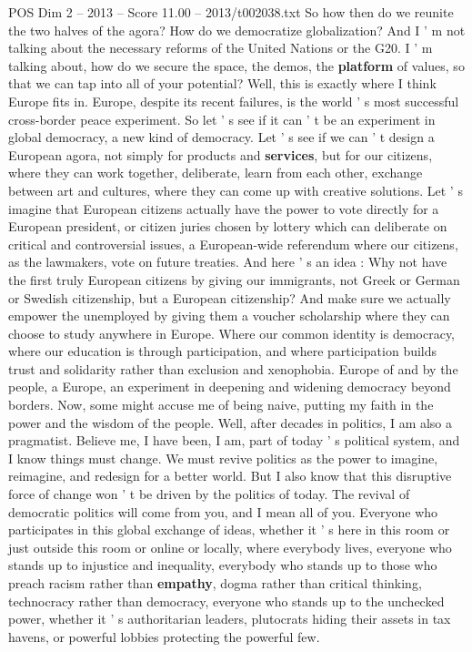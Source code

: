 \begin{textsample}{POS Dim 2 – 2013 – Score 11.00 – 2013/t002038.txt}
So how then do we reunite the two halves of the agora?
How do we democratize globalization?
And I ' m not talking about the necessary reforms of the United Nations or the G20.
I ' m talking about, how do we secure the space, the demos, the \textbf{platform} of values, so that we can tap into all of your potential?
Well, this is exactly where I think Europe fits in.
Europe, despite its recent failures, is the world ' s most successful cross-border peace experiment.
So let ' s see if it can ' t be an experiment in global democracy, a new kind of democracy.
Let ' s see if we can ' t design a European agora, not simply for products and \textbf{services}, but for our citizens, where they can work together, deliberate, learn from each other, exchange between art and cultures, where they can come up with creative solutions.
Let ' s imagine that European citizens actually have the power to vote directly for a European president, or citizen juries chosen by lottery which can deliberate on critical and controversial issues, a European-wide referendum where our citizens, as the lawmakers, vote on future treaties.
And here ' s an idea : Why not have the first truly European citizens by giving our immigrants, not Greek or German or Swedish citizenship, but a European citizenship?
And make sure we actually empower the unemployed by giving them a voucher scholarship where they can choose to study anywhere in Europe.
Where our common identity is democracy, where our education is through participation, and where participation builds trust and solidarity rather than exclusion and xenophobia.
Europe of and by the people, a Europe, an experiment in deepening and widening democracy beyond borders.
Now, some might accuse me of being naive, putting my faith in the power and the wisdom of the people.
Well, after decades in politics, I am also a pragmatist.
Believe me, I have been, I am, part of today ' s political system, and I know things must change.
We must revive politics as the power to imagine, reimagine, and redesign for a better world.
But I also know that this disruptive force of change won ' t be driven by the politics of today.
The revival of democratic politics will come from you, and I mean all of you.
Everyone who participates in this global exchange of ideas, whether it ' s here in this room or just outside this room or online or locally, where everybody lives, everyone who stands up to injustice and inequality, everybody who stands up to those who preach racism rather than \textbf{empathy}, dogma rather than critical thinking, technocracy rather than democracy, everyone who stands up to the unchecked power, whether it ' s authoritarian leaders, plutocrats hiding their assets in tax havens, or powerful lobbies protecting the powerful few.

\end{textsample}
